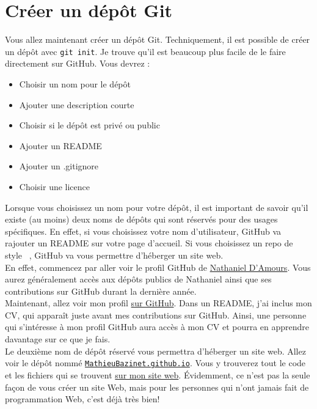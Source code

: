 \documentclass{book}
\newcommand{\code}[1]{\mbox{%
    \ttfamily
    \tcbox[
        on line,
        boxsep=0pt, left=4pt, right=4pt, top=2pt, bottom=1.5pt,
        toprule=0pt, rightrule=0pt, bottomrule=0pt, leftrule=0pt,
        oversize=0pt, enlarge left by=0pt, enlarge right by=0pt,
        colframe=white, colback=black!12,
        height=.8\baselineskip %
    ]{#1}%
}}
\begin{document}
\section{Créer un dépôt Git}\label{sec:creer_depot}

Vous allez maintenant créer un dépôt Git. Techniquement, il est possible de créer un dépôt avec \texttt{git init}. Je trouve qu'il est beaucoup plus facile de le faire directement sur GitHub. Vous devrez : 

\begin{itemize}
    \item Choisir un nom pour le dépôt
    \item Ajouter une description courte
    \item Choisir si le dépôt est privé ou public
    \item Ajouter un README
    \item Ajouter un .gitignore
    \item Choisir une licence
\end{itemize}

Lorsque vous choisissez un nom pour votre dépôt, il est important de savoir qu'il existe (au moins) deux noms de dépôts qui sont réservés pour des usages spécifiques. En effet, si vous choisissez votre nom d'utilisateur, GitHub va rajouter un README sur votre page d'accueil. Si vous choisissez un repo de style \code{<nom-d'utilisateur>.github.io}, GitHub va vous permettre d'héberger un site web. \\

En effet, commencez par aller voir le profil GitHub de \href{https://github.com/NathanielDamours}{Nathaniel D'Amours}. Vous aurez généralement accès aux dépôts publics de Nathaniel ainsi que ses contributions sur GitHub durant la dernière année. \\

Maintenant, allez voir mon profil \href{https://github.com/MathieuBazinet}{sur GitHub}. Dans un README, j'ai inclus mon CV, qui apparaît juste avant mes contributions sur GitHub. Ainsi, une personne qui s'intéresse à mon profil GitHub aura accès à mon CV et pourra en apprendre davantage sur ce que je fais. \\

Le deuxième nom de dépôt réservé vous permettra d'héberger un site web. Allez voir le dépôt nommé \href{https://github.com/MathieuBazinet/MathieuBazinet.github.io}{\texttt{MathieuBazinet.github.io}}. Vous y trouverez tout le code et les fichiers qui se trouvent \href{https://mathieubazinet.github.io/fr/}{sur mon site web}. Évidemment, ce n'est pas la seule façon de vous créer un site Web, mais pour les personnes qui n'ont jamais fait de programmation Web, c'est déjà très bien!\\
\end{document}
